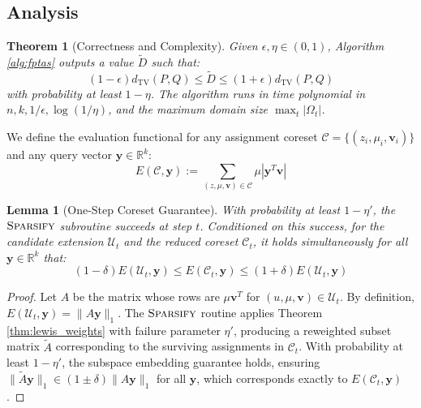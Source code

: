 \documentclass{article}
\newtheorem{lemma}{Lemma}[section]
\newtheorem{theorem}{Theorem}[section]
\begin{document}
\subsection{Analysis}

\begin{theorem}[Correctness and Complexity]
\label{thm:main_fptas}
Given $\epsilon, \eta \in (0, 1)$, Algorithm \ref{alg:fptas} outputs a value $\tilde{D}$ such that:
\begin{equation}
    (1 - \epsilon) d_{\mathrm{TV}}(P, Q) \le \tilde{D} \le (1 + \epsilon) d_{\mathrm{TV}}(P, Q)
\end{equation}
with probability at least $1 - \eta$. The algorithm runs in time polynomial in $n, k, 1/\epsilon, \log(1/\eta)$, and the maximum domain size $\max_t |\Omega_t|$.
\end{theorem}

We define the evaluation functional for any assignment coreset $\mathcal{C} = \{(z_i, \mu_i, \mathbf{v}_i)\}$ and any query vector $\mathbf{y} \in \mathbb{R}^{k}$:
\begin{equation}\label{eq:evaluation}
    E(\mathcal{C}, \mathbf{y}) := \sum_{(z, \mu, \mathbf{v}) \in \mathcal{C}} \mu \left| \mathbf{y}^T \mathbf{v} \right|
\end{equation}

\begin{lemma}[One-Step Coreset Guarantee]
\label{lem:one_step}
With probability at least $1 - \eta'$, the $\textsc{Sparsify}$ subroutine succeeds at step $t$. Conditioned on this success, for the candidate extension $\mathcal{U}_t$ and the reduced coreset $\mathcal{C}_t$, it holds simultaneously for all $\mathbf{y} \in \mathbb{R}^{k}$ that:
\begin{equation}
    (1 - \delta) E(\mathcal{U}_t, \mathbf{y}) \le E(\mathcal{C}_t, \mathbf{y}) \le (1 + \delta) E(\mathcal{U}_t, \mathbf{y})
\end{equation}
\end{lemma}
\begin{proof}
Let $A$ be the matrix whose rows are $\mu \mathbf{v}^T$ for $(u, \mu, \mathbf{v}) \in \mathcal{U}_t$. By definition, $E(\mathcal{U}_t, \mathbf{y}) = \|A\mathbf{y}\|_1$. The $\textsc{Sparsify}$ routine applies Theorem \ref{thm:lewis_weights} with failure parameter $\eta'$, producing a reweighted subset matrix $\tilde{A}$ corresponding to the surviving assignments in $\mathcal{C}_t$. With probability at least $1 - \eta'$, the subspace embedding guarantee holds, ensuring $\|\tilde{A}\mathbf{y}\|_1 \in (1 \pm \delta) \|A\mathbf{y}\|_1$ for all $\mathbf{y}$, which corresponds exactly to $E(\mathcal{C}_t, \mathbf{y})$.
\end{proof}
\end{document}
